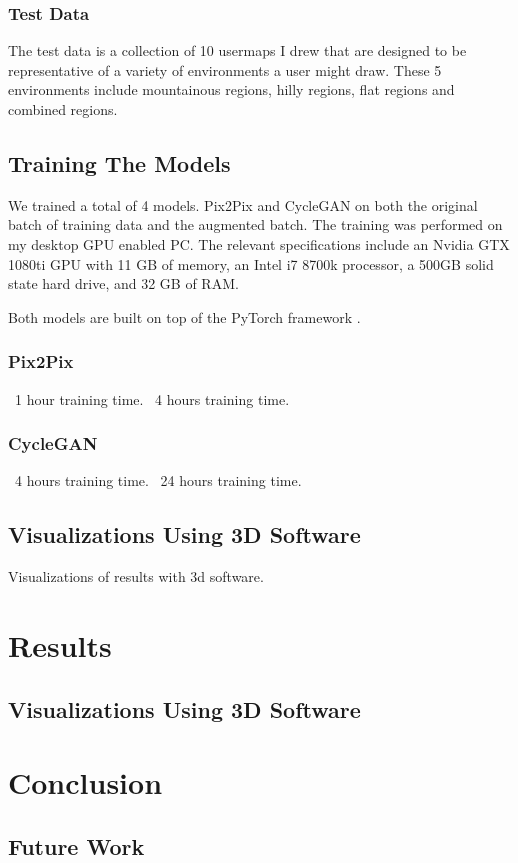 \documentclass[twocolumn]{article}
\begin{document}
	\subsubsection{Test Data}
	
	The test data is a collection of 10 usermaps I drew that are designed to be representative of a variety of environments a user might draw. These 5 environments include mountainous regions, hilly regions, flat regions and combined regions.
	
	\subsection{Training The Models}
	
	We trained a total of 4 models. Pix2Pix and CycleGAN on both the original batch of training data and the augmented batch. The training was performed on my desktop GPU enabled PC. The relevant specifications include an Nvidia GTX 1080ti GPU with 11 GB of memory, an Intel i7 8700k processor, a 500GB solid state hard drive, and 32 GB of RAM.
	
	Both models are built on top of the PyTorch framework \cite{paszke2019pytorch}.
	
	\subsubsection{Pix2Pix}
	~1 hour training time.
	~4 hours training time.
	
	\subsubsection{CycleGAN}
	~4 hours training time.
	~24 hours training time.

	\subsection{Visualizations Using 3D Software}
	
	Visualizations of results with 3d software.

	\section{Results}
	
	\subsection{Visualizations Using 3D Software}

	\section{Conclusion}
	
	\subsection{Future Work}

	
		
  
\end{document}
